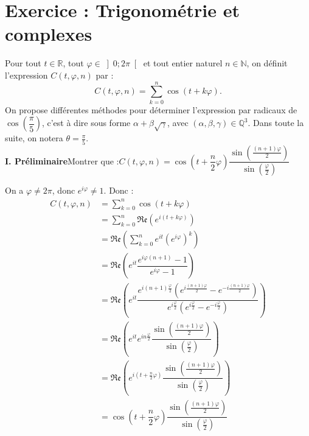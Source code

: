 \documentclass[a4paper,french,bookmarks]{article}
\newcommand{\RE}{\mathfrak{Re}}
\begin{document}
\section*{Exercice : Trigonométrie et complexes}

\noindent Pour tout $t \in \mathbb{R}$, tout $\varphi \in \left]0;2\pi\right[$ et tout entier naturel $n \in \mathbb{N}$, on définit l'expression $C(t,\varphi,n)$ par :
\[C(t,\varphi,n) = \sum_{k=0}^n \cos(t+k\varphi).\]
On propose différentes méthodes pour déterminer l'expression par radicaux de $\cos\left(\dfrac{\pi}{5}\right)$, c'est à dire sous forme $\alpha+\beta\sqrt{\gamma}$, avec $(\alpha,\beta,\gamma) \in \mathbb{Q}^3$. Dans toute la suite, on notera $\theta =\frac{\pi}{5}$.\\

\noindent\textbf{I. Préliminaire}\quad Montrer que :\quad $C(t,\varphi,n) = \cos\left(t + \dfrac{n}{2}\varphi\right)\dfrac{\sin\left(\frac{(n+1)\varphi}{2}\right)}{\sin\left(\frac{\varphi}{2}\right)}$
     \begin{tcolorbox}[colback=black!8,colframe=black!9,boxrule=.25pt,enhanced,arc is angular,arc=0pt]
     
     On a $\varphi \neq 2\pi$, donc $e^{i\varphi} \neq 1$. Donc :
     \begin{align*}
         C(t,\varphi,n) &= \sum_{k=0}^n \cos(t+k\varphi)\\
         &= \sum_{k=0}^n \RE \left(e^{i(t+k\varphi)}\right)\\
         &= \RE \left(\sum_{k=0}^n e^{it} \left(e^{i\varphi}\right)^k\right)\\
         &= \RE \left(e^{it}\dfrac{e^{i\varphi(n+1)}-1}{e^{i\varphi}-1}\right)\\
         &= \RE \left(e^{it}\dfrac{e^{i(n+1)\frac{\varphi}{2}}\left(e^{i\frac{(n+1)\varphi}{2}}-e^{-i\frac{(n+1)\varphi}{2}}\right)}{e^{i\frac{\varphi}{2}}\left(e^{i\frac{\varphi}{2}}-e^{-i\frac{\varphi}{2}}\right)}\right)\\
         &= \RE \left(e^{it}e^{in\frac{\varphi}{2}}\dfrac{\sin\left(\frac{(n+1)\varphi}{2}\right)}{\sin\left(\frac{\varphi}{2}\right)}\right)\\
         &= \RE \left(e^{i(t+\frac{n}{2}\varphi)}\dfrac{\sin\left(\frac{(n+1)\varphi}{2}\right)}{\sin\left(\frac{\varphi}{2}\right)}\right)\\
         &= \cos\left(t + \dfrac{n}{2}\varphi\right)\dfrac{\sin\left(\frac{(n+1)\varphi}{2}\right)}{\sin\left(\frac{\varphi}{2}\right)}
     \end{align*}
    \end{tcolorbox}
\end{document}
